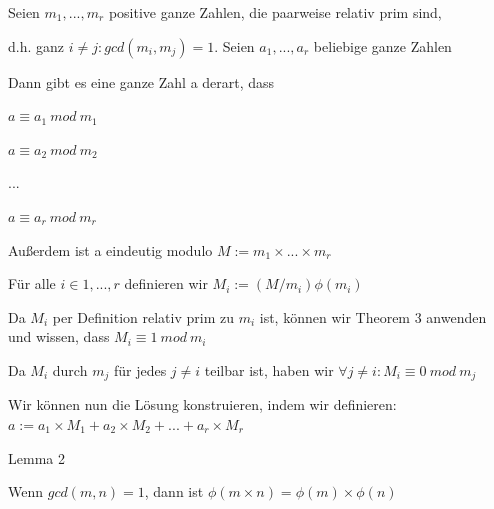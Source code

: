 \documentclass[a4paper]{article}
\begin{document}
\begin{multicols}{3}
\begin{itemize*}
            \begin{itemize*}
                  \item Seien $m_1,...,m_r$ positive ganze Zahlen, die paarweise relativ prim sind,
                  \item d.h. ganz $i\not= j:gcd(m_i, m_j) = 1$. Seien $a_1,...,a_r$ beliebige ganze Zahlen
                  \item Dann gibt es eine ganze Zahl a derart, dass
                  \begin{itemize*}
                        \item $a\equiv a_1\ mod\ m_1$
                        \item $a\equiv a_2\ mod\ m_2$
                        \item ...
                        \item $a\equiv a_r\ mod\ m_r$
                  \end{itemize*}
                  \item Außerdem ist a eindeutig modulo $M := m_1\times ...\times m_r$
                  \item Für alle $i\in{1,...,r}$ definieren wir $M_i:=(M/m_i)\phi(m_i)$
                  \item Da $M_i$ per Definition relativ prim zu $m_i$ ist, können wir Theorem 3 anwenden und wissen, dass $M_i\equiv 1\ mod\ m_i$
                  \item Da $M_i$ durch $m_j$ für jedes $j\not= i$ teilbar ist, haben wir $\forall j\not= i:M_i\equiv 0\ mod\ m_j$ \item Wir können nun die Lösung konstruieren, indem wir definieren: $a:= a_1\times M_1+a_2\times M_2+...+a_r\times M_r$
            \end{itemize*}
            \item Lemma 2
            \begin{itemize*}
                  \item Wenn $gcd(m,n)=1$, dann ist $\phi(m\times n)=\phi(m)\times \phi(n)$

\end{itemize*}
\end{itemize*}
\end{multicols}
\end{document}
